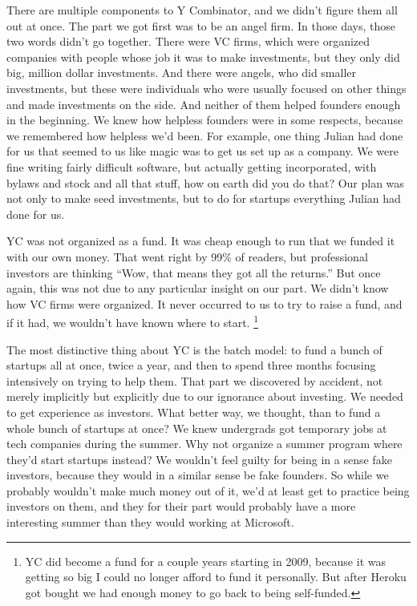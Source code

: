 \documentclass[12pt]{book}
\begin{document}
There are multiple components to Y Combinator, and we didn't figure them
all out at once. The part we got first was to be an angel firm. In those
days, those two words didn't go together. There were VC firms, which
were organized companies with people whose job it was to make
investments, but they only did big, million dollar investments. And
there were angels, who did smaller investments, but these were
individuals who were usually focused on other things and made
investments on the side. And neither of them helped founders enough in
the beginning. We knew how helpless founders were in some respects,
because we remembered how helpless we'd been. For example, one thing
Julian had done for us that seemed to us like magic was to get us set up
as a company. We were fine writing fairly difficult software, but
actually getting incorporated, with bylaws and stock and all that stuff,
how on earth did you do that? Our plan was not only to make seed
investments, but to do for startups everything Julian had done for us.

YC was not organized as a fund. It was cheap enough to run that we
funded it with our own money. That went right by 99\% of readers, but
professional investors are thinking ``Wow, that means they got all the
returns.'' But once again, this was not due to any particular insight on
our part. We didn't know how VC firms were organized. It never occurred
to us to try to raise a fund, and if it had, we wouldn't have known
where to start. \footnote{YC did become a fund for a couple years starting in 2009,
because it was getting so big I could no longer afford to fund it
personally. But after Heroku got bought we had enough money to go back
to being self-funded.}

The most distinctive thing about YC is the batch model: to fund a bunch
of startups all at once, twice a year, and then to spend three months
focusing intensively on trying to help them. That part we discovered by
accident, not merely implicitly but explicitly due to our ignorance
about investing. We needed to get experience as investors. What better
way, we thought, than to fund a whole bunch of startups at once? We knew
undergrads got temporary jobs at tech companies during the summer. Why
not organize a summer program where they'd start startups instead? We
wouldn't feel guilty for being in a sense fake investors, because they
would in a similar sense be fake founders. So while we probably wouldn't
make much money out of it, we'd at least get to practice being investors
on them, and they for their part would probably have a more interesting
summer than they would working at Microsoft.
\end{document}
